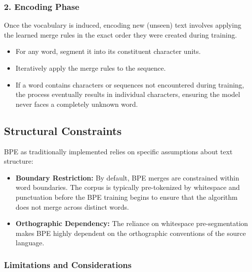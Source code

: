\documentclass[
  italian,
  11pt,
]{article}
\providecommand{\tightlist}{%
  \setlength{\itemsep}{0pt}\setlength{\parskip}{0pt}}
\begin{document}
\subsubsection{2. Encoding Phase}\label{encoding-phase}

Once the vocabulary is induced, encoding new (unseen) text involves
applying the learned merge rules in the exact order they were created
during training.

\begin{itemize}
\tightlist
\item
  For any word, segment it into its constituent character units.
\item
  Iteratively apply the merge rules to the sequence.
\item
  If a word contains characters or sequences not encountered during
  training, the process eventually results in individual characters,
  ensuring the model never faces a completely unknown word.
\end{itemize}

\subsection{Structural Constraints}\label{structural-constraints}

BPE as traditionally implemented relies on specific assumptions about
text structure:

\begin{itemize}
\tightlist
\item
  \textbf{Boundary Restriction:} By default, BPE merges are constrained
  within word boundaries. The corpus is typically pre-tokenized by
  whitespace and punctuation before the BPE training begins to ensure
  that the algorithm does not merge across distinct words.
\item
  \textbf{Orthographic Dependency:} The reliance on whitespace
  pre-segmentation makes BPE highly dependent on the orthographic
  conventions of the source language.
\end{itemize}

\subsubsection{Limitations and
Considerations}\label{limitations-and-considerations}
\end{document}
